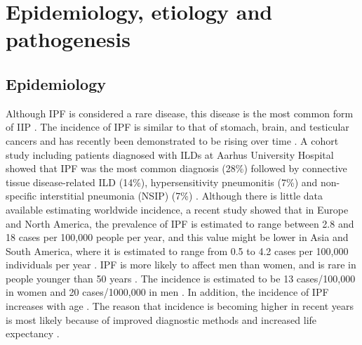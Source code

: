 \section{Epidemiology, etiology and pathogenesis} 
\subsection{Epidemiology}
Although IPF is considered a rare disease, this disease is the most common form of IIP \citep{travis2013official}. The incidence of IPF is similar to that of stomach, brain, and testicular cancers and has recently been demonstrated to be rising over time \citep{richeldi2017idiopathic}. A cohort study including patients diagnosed with ILDs at Aarhus University Hospital showed that IPF was the most common diagnosis (28\%) followed by connective tissue disease-related ILD (14\%), hypersensitivity pneumonitis (7\%) and non-specific interstitial pneumonia (NSIP) (7\%) \citep{hyldgaard2014cohort}. Although there is little data available estimating worldwide incidence, a recent study showed that in Europe and North America, the prevalence of IPF is estimated to range between 2.8 and 18 cases per 100,000 people per year, and this value might be lower in Asia and South America, where it is estimated to range from 0.5 to 4.2 cases per 100,000 individuals per year \citep{richeldi2017idiopathic}. IPF is more likely to affect men than women, and is rare in people younger than 50 years \citep{raghu2011official, raghu2006incidence}. The incidence is estimated to be 13 cases/100,000 in women and 20 cases/1000,000 in men \citep{xaubet2017idiopathic}. In addition, the incidence of IPF increases with age \citep{meltzer2008idiopathic}. The reason that incidence is becoming higher in recent years is most likely because of improved diagnostic methods and increased life expectancy \citep{xaubet2017idiopathic}.


